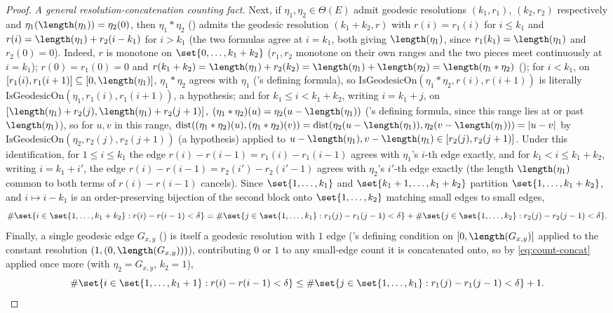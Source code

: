 \begin{proof}
  \emph{A general resolution-concatenation counting fact.} Next, if $\eta_1,\eta_2 \in \Theta(E)$
  admit geodesic resolutions $(k_1,r_1)$, $(k_2,r_2)$ respectively and $\eta_1(\length(\eta_1)) =
  \eta_2(0)$, then $\eta_1 * \eta_2$ () admits the geodesic resolution
  $(k_1+k_2, r)$ with $r(i)=r_1(i)$ for $i \le k_1$ and $r(i) = \length(\eta_1)+r_2(i-k_1)$ for $i >
  k_1$ (the two formulas agree at $i=k_1$, both giving $\length(\eta_1)$, since $r_1(k_1) =
  \length(\eta_1)$ and $r_2(0)=0$). Indeed, $r$ is monotone on $\set{0,\dots,k_1+k_2}$ ($r_1,r_2$
  monotone on their own ranges and the two pieces meet continuously at $i=k_1$); $r(0)=r_1(0)=0$
  and $r(k_1+k_2) = \length(\eta_1)+r_2(k_2) = \length(\eta_1)+\length(\eta_2) =
  \length(\eta_1*\eta_2)$ (); for $i<k_1$, on $[r_1(i),r_1(i+1)] \subseteq
  [0,\length(\eta_1)]$, $\eta_1*\eta_2$ agrees with $\eta_1$ ('s defining
  formula), so $\mathrm{IsGeodesicOn}(\eta_1*\eta_2,r(i),r(i+1))$ is literally
  $\mathrm{IsGeodesicOn}(\eta_1,r_1(i),r_1(i+1))$, a hypothesis; and for $k_1\le i<k_1+k_2$, writing
  $i=k_1+j$, on $[\length(\eta_1)+r_2(j),\length(\eta_1)+r_2(j+1)]$, $(\eta_1*\eta_2)(u) =
  \eta_2(u-\length(\eta_1))$ ('s defining formula, since this range lies at or
  past $\length(\eta_1)$), so for $u,v$ in this range, $\mathrm{dist}((\eta_1*\eta_2)(u),
  (\eta_1*\eta_2)(v)) = \mathrm{dist}(\eta_2(u-\length(\eta_1)),\eta_2(v-\length(\eta_1))) =
  |u-v|$ by $\mathrm{IsGeodesicOn}(\eta_2,r_2(j),r_2(j+1))$ (a hypothesis) applied to
  $u-\length(\eta_1),v-\length(\eta_1) \in [r_2(j),r_2(j+1)]$. Under this identification, for $1
  \le i \le k_1$ the edge $r(i)-r(i-1)=r_1(i)-r_1(i-1)$ agrees with
  $\eta_1$'s $i$-th edge exactly, and for $k_1 < i \le k_1+k_2$, writing $i = k_1+i'$, the edge
  $r(i)-r(i-1) = r_2(i')-r_2(i'-1)$ agrees with $\eta_2$'s $i'$-th edge exactly (the length
  $\length(\eta_1)$ common to both terms of $r(i)-r(i-1)$ cancels). Since $\set{1,\dots,k_1}$ and
  $\set{k_1+1,\dots,k_1+k_2}$ partition $\set{1,\dots,k_1+k_2}$, and $i \mapsto i-k_1$ is an
  order-preserving bijection of the second block onto $\set{1,\dots,k_2}$ matching small edges to
  small edges,
  \begin{equation}
    \label{eq:count-concat}
    \#\set{i \in \set{1,\dots,k_1+k_2} : r(i)-r(i-1)<\delta}
    = \#\set{j \in \set{1,\dots,k_1} : r_1(j)-r_1(j-1)<\delta}
    + \#\set{j \in \set{1,\dots,k_2} : r_2(j)-r_2(j-1)<\delta}
    .
  \end{equation}
  Finally, a single geodesic edge $G_{x,y}$ () is itself a geodesic
  resolution with $1$ edge ('s defining condition on $[0,\length(G_{x,y})]$
  applied to the constant resolution $(1,(0,\length(G_{x,y})))$), contributing $0$ or $1$ to any
  small-edge count it is concatenated onto, so by \eqref{eq:count-concat} applied once more (with
  $\eta_2 = G_{x,y}$, $k_2=1$),
  \begin{equation}
    \label{eq:count-plus-one}
    \#\set{i \in \set{1,\dots,k_1+1} : r(i)-r(i-1)<\delta}
    \le \#\set{j \in \set{1,\dots,k_1} : r_1(j)-r_1(j-1)<\delta} + 1
    .
  \end{equation}


\end{proof}
